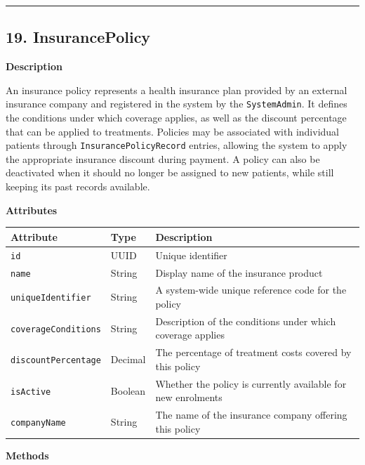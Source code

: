 \documentclass[12pt, a4paper]{article}
\begin{document}
\par\medskip\hrule\medskip

\subsection{19. InsurancePolicy}\label{sec:19-insurancepolicy}

\textbf{Description}

An insurance policy represents a health insurance plan provided by an external insurance company and registered in the system by the \texttt{SystemAdmin}. It defines the conditions under which coverage applies, as well as the discount percentage that can be applied to treatments. Policies may be associated with individual patients through \texttt{InsurancePolicyRecord} entries, allowing the system to apply the appropriate insurance discount during payment. A policy can also be deactivated when it should no longer be assigned to new patients, while still keeping its past records available.

\textbf{Attributes}

\begin{center}
\small
\renewcommand{\arraystretch}{1.35}
\begin{tabularx}{\textwidth}{|>{\raggedright\arraybackslash}p{3.4cm}|>{\raggedright\arraybackslash}p{3.3cm}|Y|}
\hline
{}
\textbf{Attribute} & \textbf{Type} & \textbf{Description} \\ \hline
\texttt{id} & UUID & Unique identifier \\ \hline
\texttt{name} & String & Display name of the insurance product \\ \hline
\texttt{uniqueIdentifier} & String & A system-wide unique reference code for the policy \\ \hline
\texttt{coverageConditions} & String & Description of the conditions under which coverage applies \\ \hline
\texttt{discountPercentage} & Decimal & The percentage of treatment costs covered by this policy \\ \hline
\texttt{isActive} & Boolean & Whether the policy is currently available for new enrolments \\ \hline
\texttt{companyName} & String & The name of the insurance company offering this policy \\ \hline
\end{tabularx}
\end{center}

\textbf{Methods}
\end{document}

